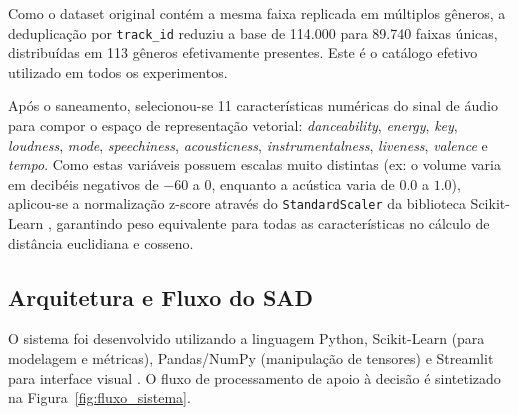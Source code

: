 \documentclass[12pt]{article}
\begin{document}
Como o dataset original contém a mesma faixa replicada em múltiplos gêneros, a deduplicação por \texttt{track\_id} reduziu a base de 114.000 para 89.740 faixas únicas, distribuídas em 113 gêneros efetivamente presentes. Este é o catálogo efetivo utilizado em todos os experimentos.

Após o saneamento, selecionou-se 11 características numéricas do sinal de áudio para compor o espaço de representação vetorial: \textit{danceability}, \textit{energy}, \textit{key}, \textit{loudness}, \textit{mode}, \textit{speechiness}, \textit{acousticness}, \textit{instrumentalness}, \textit{liveness}, \textit{valence} e \textit{tempo}. Como estas variáveis possuem escalas muito distintas (ex: o volume varia em decibéis negativos de $-60$ a $0$, enquanto a acústica varia de $0.0$ a $1.0$), aplicou-se a normalização z-score através do \texttt{StandardScaler} da biblioteca Scikit-Learn \cite{scikit-learn}, garantindo peso equivalente para todas as características no cálculo de distância euclidiana e cosseno.

\subsection{Arquitetura e Fluxo do SAD}
O sistema foi desenvolvido utilizando a linguagem Python, Scikit-Learn (para modelagem e métricas), Pandas/NumPy (manipulação de tensores) e Streamlit para interface visual \cite{streamlit}. O fluxo de processamento de apoio à decisão é sintetizado na Figura~\ref{fig:fluxo_sistema}.
\end{document}
